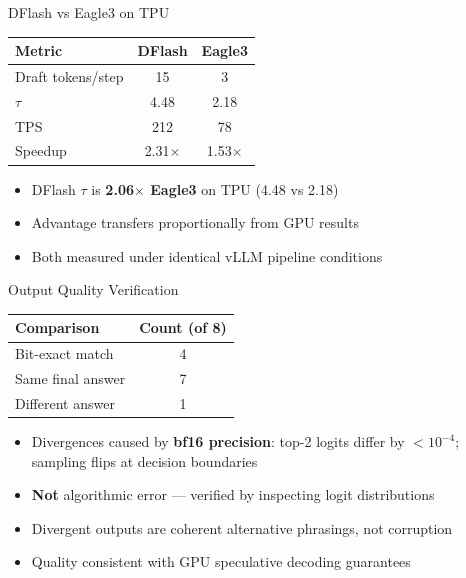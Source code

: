 \documentclass[10pt]{beamer}
\begin{document}
\begin{frame}{DFlash vs Eagle3 on TPU}
\centering
\begin{tabular}{lcc}
\toprule
\textbf{Metric} & \textbf{DFlash} & \textbf{Eagle3} \\
\midrule
Draft tokens/step & 15 & 3 \\
$\tau$ & 4.48 & 2.18 \\
TPS & 212 & 78 \\
Speedup & 2.31$\times$ & 1.53$\times$ \\
\bottomrule
\end{tabular}

\vspace{1em}
\begin{itemize}
  \item DFlash $\tau$ is \textbf{2.06$\times$ Eagle3} on TPU (4.48 vs 2.18)
  \item Advantage transfers proportionally from GPU results
  \item Both measured under identical vLLM pipeline conditions
\end{itemize}
\end{frame}

\begin{frame}{Output Quality Verification}
\centering
\begin{tabular}{lc}
\toprule
\textbf{Comparison} & \textbf{Count (of 8)} \\
\midrule
Bit-exact match & 4 \\
Same final answer & 7 \\
Different answer & 1 \\
\bottomrule
\end{tabular}

\vspace{1em}
\begin{itemize}
  \item Divergences caused by \textbf{bf16 precision}: top-2 logits differ by $< 10^{-4}$; sampling flips at decision boundaries
  \item \textbf{Not} algorithmic error --- verified by inspecting logit distributions
  \item Divergent outputs are coherent alternative phrasings, not corruption
  \item Quality consistent with GPU speculative decoding guarantees
\end{itemize}
\end{frame}
\end{document}
